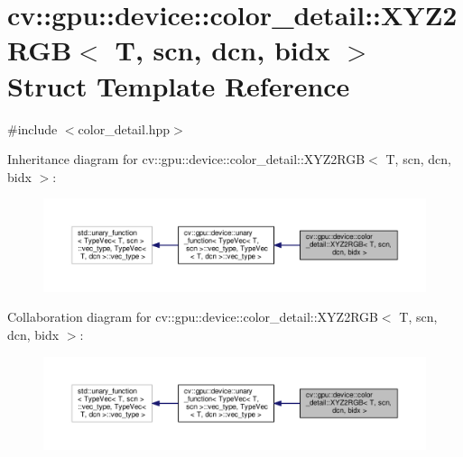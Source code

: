 \hypertarget{structcv_1_1gpu_1_1device_1_1color__detail_1_1XYZ2RGB}{\section{cv\-:\-:gpu\-:\-:device\-:\-:color\-\_\-detail\-:\-:X\-Y\-Z2\-R\-G\-B$<$ T, scn, dcn, bidx $>$ Struct Template Reference}
\label{structcv_1_1gpu_1_1device_1_1color__detail_1_1XYZ2RGB}
}


{\ttfamily \#include $<$color\-\_\-detail.\-hpp$>$}



Inheritance diagram for cv\-:\-:gpu\-:\-:device\-:\-:color\-\_\-detail\-:\-:X\-Y\-Z2\-R\-G\-B$<$ T, scn, dcn, bidx $>$\-:\nopagebreak
\begin{figure}[H]
\begin{center}
\leavevmode
\includegraphics[width=350pt]{structcv_1_1gpu_1_1device_1_1color__detail_1_1XYZ2RGB__inherit__graph}
\end{center}
\end{figure}


Collaboration diagram for cv\-:\-:gpu\-:\-:device\-:\-:color\-\_\-detail\-:\-:X\-Y\-Z2\-R\-G\-B$<$ T, scn, dcn, bidx $>$\-:\nopagebreak
\begin{figure}[H]
\begin{center}
\leavevmode
\includegraphics[width=350pt]{structcv_1_1gpu_1_1device_1_1color__detail_1_1XYZ2RGB__coll__graph}
\end{center}
\end{figure}
